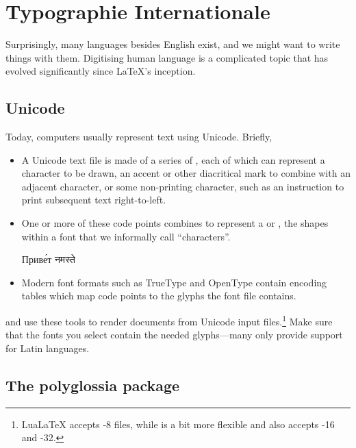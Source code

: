 \chapter{Typographie Internationale}

Surprisingly, many languages besides English exist,
and we might want to write things with them.
Digitising human language is a complicated topic that has evolved significantly
since \LaTeX's inception.

\section{Unicode}

Today, computers usually represent text using Unicode. Briefly,
\begin{itemize}
\item A Unicode text file is made of a series of ,
    each of which can represent a character to be drawn,
    an accent or other diacritical mark to combine with an adjacent character,
    or some non-printing character,
    such as an instruction to print subsequent text right-to-left.
\item One or more of these code points combines to represent a
     or ,
    the shapes within a font that we informally call ``characters''\quotekern.
\begin{centerfigure}
\large%
%
Приве́т
\quad{}%
नमस्ते
\end{centerfigure}
\item Modern font formats such as TrueType and OpenType contain encoding tables
    which map code points to the glyphs the font file contains.
\end{itemize}
\LuaLaTeX{} and \XeLaTeX{} use these tools to render documents
from Unicode input
files.\punckern\footnote{LuaLaTeX accepts \mbox{-8} files,
while \XeLaTeX is a bit more flexible and also
accepts \mbox{-16} and
\mbox{-32}.}
Make sure that the fonts you select contain the needed glyphs---many
only provide support for Latin languages.

\section{The polyglossia package}

